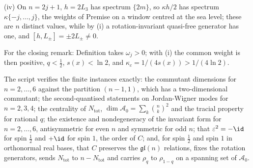(iv) On $n = 2j + 1$, $h = 2L_{3}$ has spectrum $\{2m\}$, so $\kappa h/2$ has spectrum $\kappa\{-j, \ldots, j\}$, the weights of Premise  on a window centred at the sea level; these are $n$ distinct values, while by (i) a rotation-invariant quasi-free generator has one, and $[h, L_{\pm}] = \pm 2L_{\pm} \neq 0$.

For the closing remark: Definition  takes $\omega_{j} > 0$; with (i) the common weight is then positive, $q < \tfrac12$, $s(x) < \ln 2$, and $\kappa_{c} = 1/(4s(x)) > 1/(4\ln 2)$.

The script verifies the finite instances exactly: the commutant dimensions for $n = 2, \ldots, 6$ against the partition $(n-1, 1)$, which has a two-dimensional commutant; the second-quantised statements on Jordan-Wigner modes for $n = 2, 3, 4$; the centrality of $N_{\mathrm{tot}}$, $\dim\mathcal{A}_{0} = \sum_{k}\binom{n}{k}^{2}$ and the tracial property for rational $q$; the existence and nondegeneracy of the invariant form for $n = 2, \ldots, 6$, antisymmetric for even $n$ and symmetric for odd $n$; that $\varepsilon^{2} = -\id$ for spin $\tfrac12$ and $+\id$ for spin $1$, the order of $C$; and, for spin $\tfrac12$ and spin $1$ in orthonormal real bases, that $C$ preserves the $\mathfrak{gl}(n)$ relations, fixes the rotation generators, sends $N_{\mathrm{tot}}$ to $n - N_{\mathrm{tot}}$ and carries $\rho_{q}$ to $\rho_{1-q}$ on a spanning set of $\mathcal{A}_{0}$.
